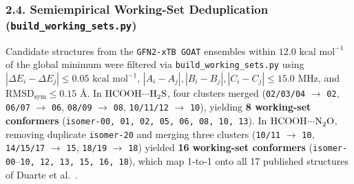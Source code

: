 \documentclass[journal=jpclcd,manuscript=article]{achemso}
\begin{document}
\subsubsection{2.4. Semiempirical Working-Set Deduplication (\texttt{build\_working\_sets.py})}
Candidate structures from the \texttt{GFN2-xTB GOAT} ensembles within $12.0\text{ kcal mol}^{-1}$ of the global minimum were filtered via \texttt{build\_working\_sets.py} using $|\Delta E_i - \Delta E_j| \le 0.05\text{ kcal mol}^{-1}$, $|A_i - A_j|, |B_i - B_j|, |C_i - C_j| \le 15.0\text{ MHz}$, and $\mathrm{RMSD}_{\mathrm{sym}} \le 0.15\text{ \AA}$. In $\ce{HCOOH\bond{...}H2S}$, four clusters merged (\texttt{02/03/04} $\to$ \texttt{02}, \texttt{06/07} $\to$ \texttt{06}, \texttt{08/09} $\to$ \texttt{08}, \texttt{10/11/12} $\to$ \texttt{10}), yielding \textbf{8 working-set conformers} (\texttt{isomer-00, 01, 02, 05, 06, 08, 10, 13}). In $\ce{HCOOH\bond{...}N2O}$, removing duplicate \texttt{isomer-20} and merging three clusters (\texttt{10/11} $\to$ \texttt{10}, \texttt{14/15/17} $\to$ \texttt{15}, \texttt{18/19} $\to$ \texttt{18}) yielded \textbf{16 working-set conformers} (\texttt{isomer-00}--\texttt{10, 12, 13, 15, 16, 18}), which map 1-to-1 onto all 17 published structures of Duarte et al.\ \cite{Duarte2017}.
\end{document}
